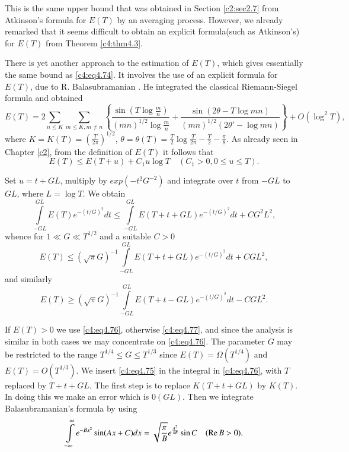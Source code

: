 This is the same upper bound that was obtained in Section
\ref{c2:sec2.7} from Atkinson's formula for $E(T)$ by an averaging
process. However, we already remarked that it seems difficult to
obtain an explicit formula\pageoriginale (such as Atkinson's) for
$E(T)$ from Theorem \ref{c4:thm4.3}.

There is yet another approach to the estimation of $E(T)$, which gives
essentially the same bound as \eqref{c4:eq4.74}. It involves the use
of an explicit formula for $E(T)$, due to R. Balasubramanian
\cite{Balasubramanian1}. He integrated the classical Riemann-Siegel formula and
obtained
{\fontsize{9pt}{11pt}\selectfont
\begin{equation}
 E(T)  = 
   2 \sum_{n \leq K} \sum_{m \leq K, m \neq n}  \left\{\frac{\sin
    (T \log \frac{m}{n})}{(mn)^{1/2} \log \frac{m}{n}} + \frac{\sin (2
    \theta - T \log mn)}{(mn)^{1/2} (2 \theta' - \log mn)}
  \right\}+ O(\log^2 T),\label{c4:eq4.75}
\end{equation}}
where $K= K(T)= \left( \frac{T}{2 \pi}\right)^{1/2}$, $\theta =
\theta(T) = \frac{T}{2} \log \frac{T}{2 \pi}- \frac{T}{2} -
\frac{\pi}{8}$. As already seen in Chapter \ref{c2}, from the definition of
$E(T)$ it follows that 
$$
E(T) \leq E(T+ u) + C_1 u \log T \quad (C_1 > 0, 0\leq u \leq T).
$$

Set $u=t+ GL$, multiply by $exp (-t^2 G^{-2})$ and integrate over $t$
from $-GL$ to $GL$, where $L= \log T$. We obtain 
$$
\int\limits_{-GL}^{GL} E(T) e^{-(t/G)^2}dt \leq \int\limits_{-GL}^{GL}
E(T + t + GL) e^{- (t/G)^2}dt+ CG^2 L^2,
$$
whence for $1 \ll G \ll T^{1/2}$ and a suitable $C> 0$
\begin{equation}
  E(T) \leq \left(\sqrt{\pi}G\right)^{-1} \int\limits_{-GL}^{GL} E(T+ t + GL)
  e^{- (t/G)^2}dt + CGL^2,\label{c4:eq4.76} 
\end{equation}
and similarly
\begin{equation}
  E(T) \geq \left(\sqrt{\pi}G\right)^{-1} \int\limits_{-GL}^{GL} E(T+ t - GL)
  e^{-(t/G)^2}dt - CGL^2.\label{c4:eq4.77}
\end{equation}

If $E(T)> 0$ we use \eqref{c4:eq4.76}, otherwise \eqref{c4:eq4.77},
and since the analysis is similar in both cases we may concentrate
on \eqref{c4:eq4.76}. The parameter $G$ may be restricted to the range
$T^{1/4} \leq G \leq T^{1/3}$ since $E(T) = \Omega (T^{1/4})$ and
$E(T) = O(T^{1/3})$. We insert \eqref{c4:eq4.75} in the integral
in \eqref{c4:eq4.76}, with $T$ replaced by $T+t+GL$. The first step is
to replace $K(T + t + GL)$ by $K(T)$. In doing this we make an error
which is $0(GL)$. Then we integrate Balasubramanian's formula by using
\begin{equation}
  \int\limits_{-\infty}^\infty e^{-Bx^2} \sin (Ax + C)dx =
  \sqrt{\frac{\pi}{B}} e^{\frac{A^2}{4B}} \sin C \quad (\operatorname{Re} B >
  0). \label{c4:eq4.78} 
\end{equation}

